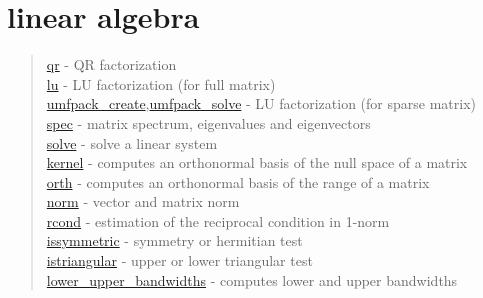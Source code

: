 \chapter*{linear algebra}

\begin{quote}
\noindent
\hyperlink{qr}{qr} - QR factorization\\
\hyperlink{lu}{lu} - LU factorization (for full matrix) \\
\hyperlink{umfpack_create}{umfpack\_create},\hyperlink{umfpack_solve}{umfpack\_solve}
- LU factorization (for sparse matrix) \\
\hyperlink{spec}{spec} - matrix spectrum, eigenvalues and eigenvectors\\
\hyperlink{solve}{solve} - solve a linear system\\
\hyperlink{kernel}{kernel} - computes an orthonormal basis of the null space of a matrix\\
\hyperlink{orth}{orth} - computes an orthonormal basis of the range of a matrix\\
\hyperlink{norm}{norm} - vector and matrix norm\\
\hyperlink{rcond}{rcond} - estimation of the reciprocal condition in 1-norm\\
\hyperlink{issymmetric}{issymmetric} - symmetry or hermitian test\\
\hyperlink{istriangular}{istriangular} - upper or lower triangular test\\
\hyperlink{lower_upper_bandwidths}{lower\_upper\_bandwidths} - computes lower and upper bandwidths\\
\end{quote}

 
 
 
 
 


 
 
 


